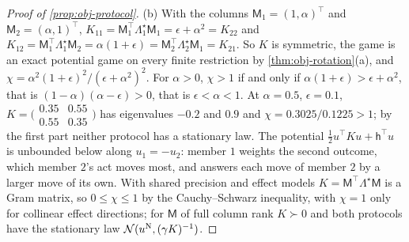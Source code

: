 \begin{proof}[Proof of \cref{prop:obj-protocol}]
(b) With the columns $\mathsf M_1=(1,\alpha)^\top$ and $\mathsf M_2=(\alpha,1)^\top$, $K_{11}=\mathsf M_1^\top\Lambda^\star_1\mathsf M_1=\epsilon+\alpha^2=K_{22}$ and $K_{12}=\mathsf M_1^\top\Lambda^\star_1\mathsf M_2=\alpha(1+\epsilon)=\mathsf M_2^\top\Lambda^\star_2\mathsf M_1=K_{21}$. So $K$ is symmetric, the game is an exact potential game on every finite restriction by \cref{thm:obj-rotation}(a), and $\chi=\alpha^2(1+\epsilon)^2/(\epsilon+\alpha^2)^2$. For $\alpha>0$, $\chi>1$ if and only if $\alpha(1+\epsilon)>\epsilon+\alpha^2$, that is $(1-\alpha)(\alpha-\epsilon)>0$, that is $\epsilon<\alpha<1$. At $\alpha=0.5$, $\epsilon=0.1$, $K=\bigl(\begin{smallmatrix}0.35&0.55\\0.55&0.35\end{smallmatrix}\bigr)$ has eigenvalues $-0.2$ and $0.9$ and $\chi=0.3025/0.1225>1$; by the first part neither protocol has a stationary law. The potential $\frac12u^\top Ku+\mathsf h^\top u$ is unbounded below along $u_1=-u_2$: member $1$ weights the second outcome, which member $2$'s act moves most, and answers each move of member $2$ by a larger move of its own. With shared precision and effect models $K=\mathsf M^\top\Lambda^\star\mathsf M$ is a Gram matrix, so $0\le\chi\le1$ by the Cauchy--Schwarz inequality, with $\chi=1$ only for collinear effect directions; for $\mathsf M$ of full column rank $K\succ0$ and both protocols have the stationary law $\mathcal{N}(u^{\mathrm N},(\gamma K)^{-1})$.
\end{proof}

